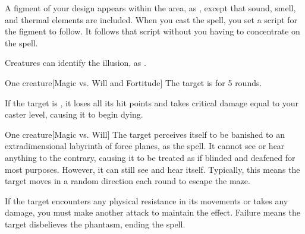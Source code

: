 \begin{spellheader}
    \spelldur{\durmed \dismissable}
\end{spellheader}
\begin{spelleffects}
    \spelleffect A figment of your design appears within the area, as , except that sound, smell, and thermal elements are included. When you cast the spell, you set a script for the figment to follow. It follows that script without you having to concentrate on the spell.
\end{spelleffects}
\begin{spellfooter}
    \spellnotes Creatures can identify the illusion, as .
\end{spellfooter}

\begin{spellheader}
    \spellrng{\rngmed}
\end{spellheader}
\begin{spelleffects}
    \begin{spelltarget}{One creature}[Magic vs. Will and Fortitude]
        \spellsuccess[Will] The target is \shaken for 5 rounds.

         If the target is \bloodied, it loses all its hit points and takes critical damage equal to your caster level, causing it to begin dying.
    \end{spelltarget}
\end{spelleffects}

\begin{spellheader}
    \spellrng{\rngmed}
    \spelldur{\durmed}
\end{spellheader}
\begin{spelleffects}
    \begin{spelltarget}{One creature}[Magic vs. Will]
        \spellsuccess The target perceives itself to be banished to an extradimensional labyrinth of force planes, as the  spell. It cannot see or hear anything to the contrary, causing it to be treated as if blinded and deafened for most purposes. However, it can still see and hear itself. Typically, this means the target moves in a random direction each round to escape the maze.

        If the target encounters any physical resistance in its movements or takes any damage, you must make another attack to maintain the effect. Failure means the target disbelieves the phantasm, ending the spell.
    \end{spelltarget}
\end{spelleffects}

